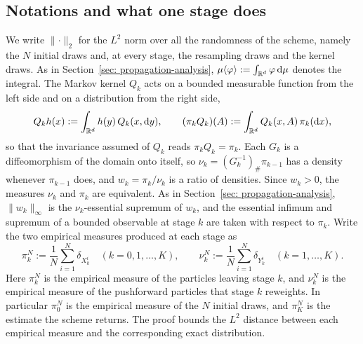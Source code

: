 \documentclass{article}
\begin{document}
\subsection{Notations and what one stage does}
\label{subsec: appendix-notation}

We write $\lVert\cdot\rVert_2$ for the $L^2$ norm over all the randomness of the scheme, namely the $N$ initial draws and, at every stage, the resampling draws and the kernel draws. As in Section~\ref{sec: propagation-analysis}, $\mu\langle \varphi\rangle:=\int_{\mathbb R^d}\varphi\,\mathrm{d}\mu$ denotes the integral. The Markov kernel $Q_k$ acts on a bounded measurable function from the left side and on a distribution from the right side,
\begin{equation}
    Q_kh(x) := \int_{\mathbb R^d} h(y)\,Q_k(x,\mathrm{d} y) ,
    \qquad
    (\pi_kQ_k)(A) := \int_{\mathbb R^d} Q_k(x,A)\,\pi_k(\mathrm{d} x) ,
    \label{eq: appendix-kernel}
\end{equation}
so that the invariance assumed of $Q_k$ reads $\pi_kQ_k=\pi_k$. Each $G_k$ is a diffeomorphism of the domain onto itself, so $\nu_k=(G_k^{-1})_{\#}\pi_{k-1}$ has a density whenever $\pi_{k-1}$ does, and $w_k=\pi_k/\nu_k$ is a ratio of densities. Since $w_k>0$, the measures $\nu_k$ and $\pi_k$ are equivalent. As in Section~\ref{sec: propagation-analysis}, $\lVert w_k\rVert_\infty$ is the $\nu_k$-essential supremum of $w_k$, and the essential infimum and supremum of a bounded observable at stage $k$ are taken with respect to $\pi_k$. Write the two empirical measures produced at each stage as
\begin{equation}
    \pi_k^N := \frac1N\sum_{i=1}^{N}\delta_{X_k^i}
    \quad (k=0,1,\dots,K),
    \qquad
    \nu_k^N := \frac1N\sum_{i=1}^{N}\delta_{Y_k^i}
    \quad (k=1,\dots,K) .
    \label{eq: appendix-empirical}
\end{equation}
Here $\pi_k^N$ is the empirical measure of the particles leaving stage $k$, and $\nu_k^N$ is the empirical measure of the pushforward particles that stage $k$ reweights. In particular $\pi_0^N$ is the empirical measure of the $N$ initial draws, and $\pi_K^N$ is the estimate the scheme returns. The proof bounds the $L^2$ distance between each empirical measure and the corresponding exact distribution.
\end{document}

